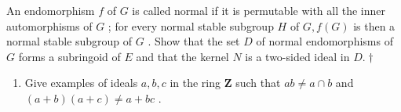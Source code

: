 An endomorphism \(f\) of \(G\) is called normal if it is permutable with all the inner automorphisms of \(G\) ; for every normal stable subgroup \(H\) of \(G, f(G)\) is then a normal stable subgroup of \(G\) . Show that the set \(D\) of normal endomorphisms of \(G\) forms a subringoid of \(E\) and that the kernel \(N\) is a two-sided ideal in \(D.†\)

\begin{enumerate}
\def\labelenumi{\arabic{enumi}.}
\setcounter{enumi}{15}
\tightlist
\item
  Give examples of ideals \(a, b, c\) in the ring \(\mathbf{Z}\) such that \(ab \neq a \cap b\) and \((a + b)(a + c) \neq a + bc\) .
\end{enumerate}

